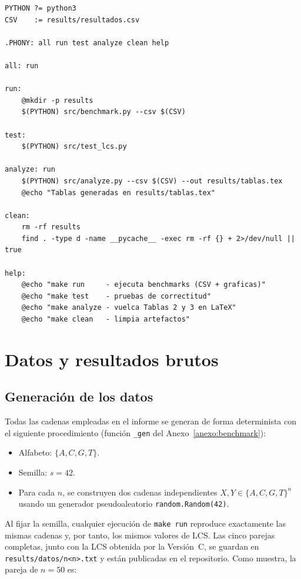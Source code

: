\documentclass[11pt,a4paper]{article}
\begin{document}
\begin{lstlisting}[style=mk, caption={\texttt{Makefile}}]
PYTHON ?= python3
CSV    := results/resultados.csv

.PHONY: all run test analyze clean help

all: run

run:
	@mkdir -p results
	$(PYTHON) src/benchmark.py --csv $(CSV)

test:
	$(PYTHON) src/test_lcs.py

analyze: run
	$(PYTHON) src/analyze.py --csv $(CSV) --out results/tablas.tex
	@echo "Tablas generadas en results/tablas.tex"

clean:
	rm -rf results
	find . -type d -name __pycache__ -exec rm -rf {} + 2>/dev/null || true

help:
	@echo "make run     - ejecuta benchmarks (CSV + graficas)"
	@echo "make test    - pruebas de correctitud"
	@echo "make analyze - vuelca Tablas 2 y 3 en LaTeX"
	@echo "make clean   - limpia artefactos"
\end{lstlisting}

\section{Datos y resultados brutos}\label{anexo:datos}

\subsection{Generación de los datos}

Todas las cadenas empleadas en el informe se generan de forma
determinista con el siguiente procedimiento (función \texttt{\_gen} del
Anexo~\ref{anexo:benchmark}):

\begin{itemize}
    \item Alfabeto: $\{A,C,G,T\}$.
    \item Semilla: $s=42$.
    \item Para cada $n$, se construyen dos cadenas independientes
          $X,Y\in\{A,C,G,T\}^n$ usando un generador pseudoaleatorio
          \texttt{random.Random(42)}.
\end{itemize}

Al fijar la semilla, cualquier ejecución de \texttt{make run} reproduce
exactamente las mismas cadenas y, por tanto, los mismos valores de LCS.
Las cinco parejas completas, junto con la LCS obtenida por la
Versión~C, se guardan en \texttt{results/datos/n<n>.txt} y están
publicadas en el repositorio. Como muestra, la pareja de $n=50$ es:
\end{document}
